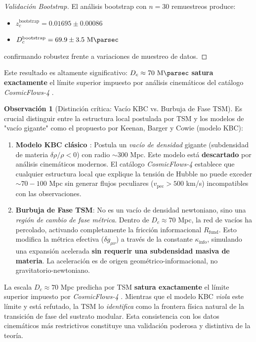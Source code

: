 \documentclass[11pt, a4paper]{article}
\theoremstyle{plain}
\theoremstyle{definition}
\newtheorem{observacion}[teorema]{Observación}
\newcommand{\Rfactor}{R_{\text{fund}}}
\newcommand{\Kinfo}{\kappa_{\text{info}}}
\begin{document}
\begin{proof}[Validación Bootstrap]
El análisis bootstrap con $n=30$ remuestreos produce:
\begin{itemize}
    \item $z_c^{\text{bootstrap}} = 0.01695 \pm 0.00086$
    \item $D_c^{\text{bootstrap}} = 69.9 \pm 3.5\ \si{\mega\parsec}$
\end{itemize}
confirmando robustez frente a variaciones de muestreo de datos.
\end{proof}

Este resultado es altamente significativo: $D_c \approx 70\ \si{\mega\parsec}$ \textbf{satura exactamente} el límite superior impuesto por análisis cinemáticos del catálogo \textit{CosmicFlows-4} \cite{Mazurenko2024}. 


\begin{observacion}[Distinción crítica: Vacío KBC vs. Burbuja de Fase TSM]
\label{obs:kbc_vs_tsm}
Es crucial distinguir entre la estructura local postulada por TSM y los modelos de "vacío gigante" como el propuesto por Keenan, Barger y Cowie (modelo KBC):

\begin{enumerate}
    \item \textbf{Modelo KBC clásico \cite{KBC2010}}: Postula un \textit{vacío de densidad} gigante (subdensidad de materia $\delta\rho/\rho < 0$) con radio $\sim 300$ Mpc. Este modelo está \textbf{descartado} por análisis cinemáticos modernos. El catálogo \textit{CosmicFlows-4} \cite{Mazurenko2024} establece que cualquier estructura local que explique la tensión de Hubble no puede exceder $\sim 70-100$ Mpc sin generar flujos peculiares ($v_{\text{pec}} > 500$ km/s) incompatibles con las observaciones.

    \item \textbf{Burbuja de Fase TSM}: No es un vacío de densidad newtoniano, sino una \textit{región de cambio de fase métrica}. Dentro de $D_c \approx 70$ Mpc, la red de vacíos ha percolado, activando completamente la fricción informacional $\Rfactor$. Esto modifica la métrica efectiva ($\delta g_{\mu\nu}$) a través de la constante $\Kinfo$, simulando una expansión acelerada \textbf{sin requerir una subdensidad masiva de materia}. La aceleración es de origen geométrico-informacional, no gravitatorio-newtoniano.
\end{enumerate}

La escala $D_c \approx 70$ Mpc predicha por TSM \textbf{satura exactamente} el límite superior impuesto por \textit{CosmicFlows-4} \cite{Mazurenko2024}. Mientras que el modelo KBC \textit{viola} este límite y está refutado, la TSM lo \textit{identifica} como la frontera física natural de la transición de fase del sustrato modular. Esta consistencia con los datos cinemáticos más restrictivos constituye una validación poderosa y distintiva de la teoría.
\end{observacion}
\end{document}
